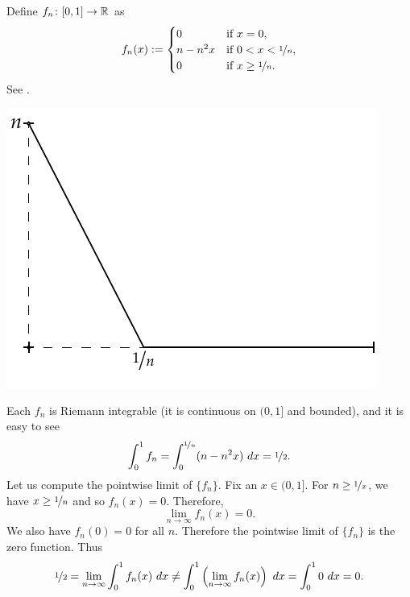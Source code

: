 \begin{example}
Define $f_n \colon [0,1] \to {\mathbb{R}}$ as
\begin{equation*}
f_n(x) :=
\begin{cases}
0 &  \text{if } x = 0,\\
n-n^2x &  \text{if } 0 < x < \nicefrac{1}{n},\\
0 &  \text{if } x \geq \nicefrac{1}{n}.
\end{cases}
\end{equation*}
See .

\begin{myfigureht}
\includegraphics{figures/intconvcntr}
\caption{Graph of $f_n(x)$.%
\label{intconvcntr:fig}}
\end{myfigureht}

Each $f_n$ is Riemann integrable (it is continuous on $(0,1]$ and bounded),
and it is easy to see
\begin{equation*}
\int_0^1 f_n =
\int_0^{\nicefrac{1}{n}} (n-n^2x)~dx = \nicefrac{1}{2} .
\end{equation*}
Let us compute the pointwise limit of $\{ f_n \}$.
Fix an $x \in (0,1]$.  For $n \geq \nicefrac{1}{x}$,
we have $x \geq \nicefrac{1}{n}$ and so $f_n(x) = 0$.  Therefore,
\begin{equation*}
\lim_{n \to \infty} f_n(x) = 0.
\end{equation*}
We also have $f_n(0) = 0$ for all $n$.  Therefore the pointwise
limit of $\{ f_n \}$ is the zero function.  Thus
\begin{equation*}
\nicefrac{1}{2} =
\lim_{n\to\infty}
\int_0^1 f_n (x)~dx
\not=
\int_0^1
\left(
\lim_{n\to\infty}
f_n(x)\right)~dx
=
\int_0^1 0~dx = 0 .
\end{equation*}
\end{example}

